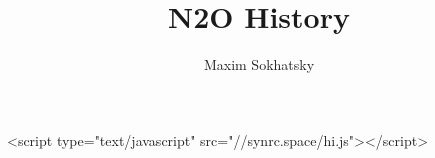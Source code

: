 

\title{N2O History}
\author{Maxim Sokhatsky}


\begin{rawhtml}
<script type="text/javascript" src="//synrc.space/hi.js"></script>
\end{rawhtml}
